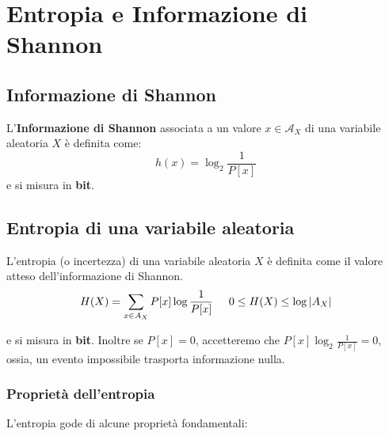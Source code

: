 \chapter{Entropia e Informazione di Shannon}

\section{Informazione di Shannon}
L'\textbf{Informazione di Shannon} associata a un valore $x \in \mathcal A_X$ di una variabile aleatoria $X$ è definita come:
$$
h(x) = \log_{2}\frac{1}{P[x]}
$$
e si misura in \textbf{bit}.

\section{Entropia di una variabile aleatoria}
L'entropia (o incertezza) di una variabile aleatoria $X$ è definita come il valore atteso dell'informazione di Shannon.
$$
H(X) = \sum_{x\in A_X}P[x]\log\frac{1}{P[x]} \hspace{0.5cm} 0\le H(X)\le \log \left| A_X \right| 
$$

e si misura in \textbf{bit}. Inoltre se $P[x] = 0$, accetteremo che $P[x] \log_{2} \frac{1}{P[x]} = 0$, ossia, un evento impossibile trasporta informazione nulla.

\subsection{Proprietà dell'entropia}
L'entropia gode di alcune proprietà fondamentali:

